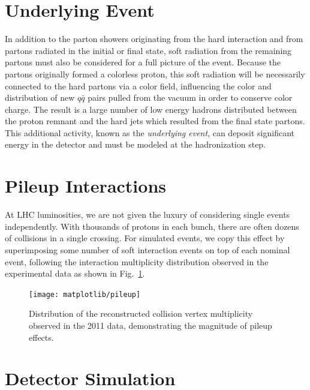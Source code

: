 \section{Underlying Event}

In addition to the parton showers originating from the hard interaction and from partons radiated in the initial or final state, soft radiation from the remaining partons must also be considered for a full picture of the event.  Because the partons originally formed a colorless proton, this soft radiation will be necessarily connected to the hard partons via a color field, influencing the color and distribution of new $q\bar{q}$ pairs pulled from the vacuum in order to conserve color charge.  The result is a large number of low energy hadrons distributed between the proton remnant and the hard jets which resulted from the final state partons.  This additional activity, known as the \emph{underlying event}, can deposit significant energy in the detector and must be modeled at the hadronization step.

\section{Pileup Interactions}

At LHC luminosities, we are not given the luxury of considering single events independently.  With thousands of protons in each bunch, there are often dozens of collisions in a single crossing.  For simulated events, we copy this effect by superimposing some number of soft interaction events on top of each nominal event, following the interaction multiplicity distribution observed in the experimental data as shown in Fig.~\ref{fig:pileup}.

\begin{figure}
  \centering
  \texttt{[image: matplotlib/pileup]}
  \caption[Distribution of the reconstructed collision vertex multiplicity observed in the 2011 data]{Distribution of the reconstructed collision vertex multiplicity observed in the 2011 data, demonstrating the magnitude of pileup effects.}
  \label{fig:pileup}
\end{figure}


\section{Detector Simulation}

